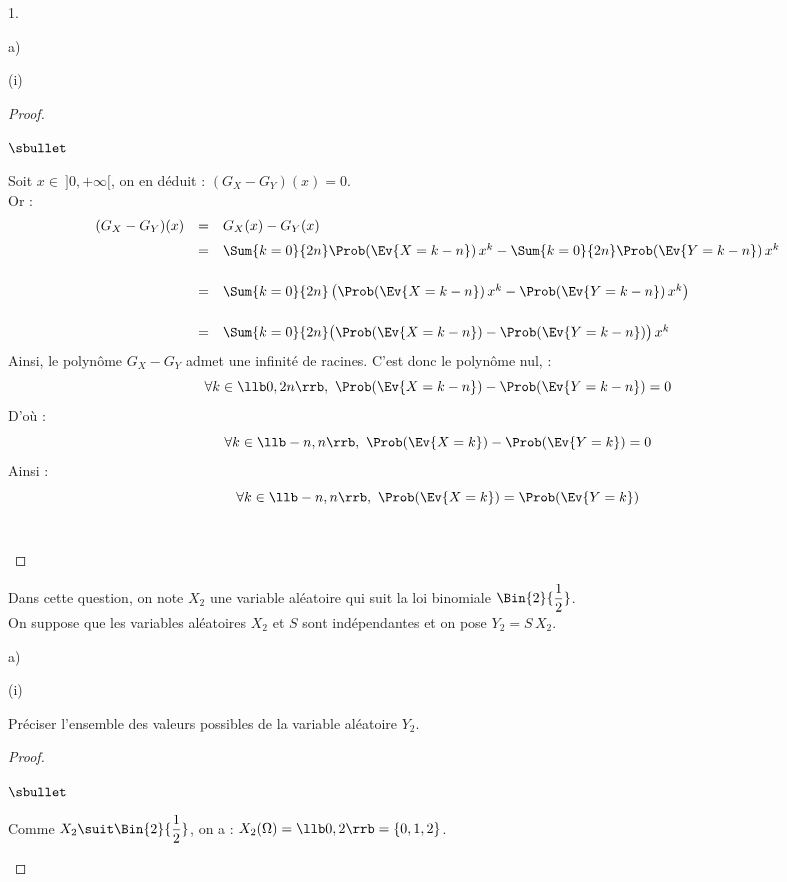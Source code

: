 \documentclass[11pt]{article}%
\begin{document}
\begin{noliste}{1.}
\begin{noliste}{a)}
\begin{nonoliste}{(i)}
\begin{proof}
\begin{noliste}{$\sbullet$}
        \item Soit $x \in \ ]0,+\infty[$, on en déduit :
          $(G_X-G_Y)(x) = 0$.\\
          Or :
          \[
            \begin{array}{rcl}
              (G_X-G_Y)(x)
              & = &  G_X(x) - G_Y(x)
              \\[.2cm]
              & = & \Sum{k=0}{2n} \Prob(\Ev{X = k-n}) \,
                    x^k - \Sum{k=0}{2n} \Prob(\Ev{Y = k-n}) \, x^k
              \\[.6cm]
              & = & \Sum{k=0}{2n} \left(\Prob(\Ev{X = k-n}) \, x^k -
                    \Prob(\Ev{Y = k-n}) \, x^k \right)
              \\[.6cm]
              & = & \Sum{k=0}{2n} \big( \Prob(\Ev{X = k-n}) -
                    \Prob(\Ev{Y = k-n})\big) \, x^k
            \end{array}
          \]
          Ainsi, le polynôme $G_X-G_Y$ admet une infinité de
          racines. C'est donc le polynôme nul, \ie :
          \[
            \forall k \in \llb 0,2n \rrb, \ \Prob(\Ev{X = k-n}) -
            \Prob(\Ev{Y = k-n}) =0
          \]
          D'où :
          \[
            \forall k \in \llb -n,n \rrb, \ \Prob(\Ev{X = k}) -
            \Prob(\Ev{Y = k}) =0
          \]
          Ainsi :
          \[
            \forall k \in \llb -n,n \rrb, \ \Prob(\Ev{X = k}) =
            \Prob(\Ev{Y = k})
          \]
          ~\\[-1.4cm]
        \end{noliste}
      \end{proof}
    \end{nonoliste}
  \end{noliste}


  \newpage
  
  
\item Dans cette question, on note $X_2$ une variable aléatoire qui
  suit la loi binomiale $\Bin{2}{\dfrac{1}{2}}$.\\
  On suppose que les variables aléatoires $X_2$ et $S$ sont
  indépendantes et on pose $Y_2 = S \, X_2$.
  \begin{noliste}{a)}
    \setlength{\itemsep}{2mm}
  \item
    \begin{nonoliste}{(i)}
      \setlength{\itemsep}{2mm}
    \item Préciser l'ensemble des valeurs possibles de la variable
      aléatoire $Y_2$.
      \begin{proof}~
        \begin{noliste}{$\sbullet$}
        \item Comme $X_2 \suit \Bin{2}{\dfrac{1}{2}}$, on a : $X_2(\Omega) =
          \llb 0,2 \rrb = \{0,1,2\}$.
          

\end{noliste}
\end{proof}
\end{nonoliste}
\end{noliste}
\end{noliste}
\end{document}
